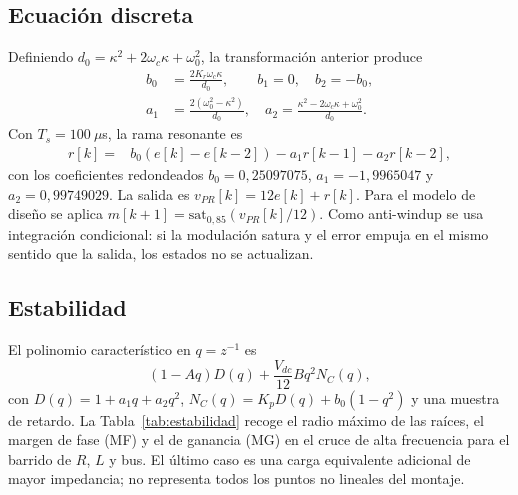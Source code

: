 \documentclass[conference]{IEEEtran}
\begin{document}
\subsection{Ecuación discreta}
Definiendo $d_0=\kappa^2+2\omega_c\kappa+\omega_0^2$, la transformación anterior produce
\begin{align}
b_0&=\frac{2K_r\omega_c\kappa}{d_0},\qquad b_1=0,\quad b_2=-b_0,\\
a_1&=\frac{2(\omega_0^2-\kappa^2)}{d_0},\quad
a_2=\frac{\kappa^2-2\omega_c\kappa+\omega_0^2}{d_0}.
\end{align}
Con $T_s=100\ \mu$s, la rama resonante es
\begin{align}
r[k]={}&b_0(e[k]-e[k-2])-a_1r[k-1]-a_2r[k-2],
\end{align}
con los coeficientes redondeados $b_0=0{,}25097075$, $a_1=-1{,}9965047$ y $a_2=0{,}99749029$. La salida es $v_{PR}[k]=12e[k]+r[k]$. Para el modelo de diseño se aplica $m[k+1]=\mathrm{sat}_{0{,}85}(v_{PR}[k]/12)$. Como anti-windup se usa integración condicional: si la modulación satura y el error empuja en el mismo sentido que la salida, los estados no se actualizan.

\subsection{Estabilidad}
El polinomio característico en $q=z^{-1}$ es
\begin{equation}
(1-Aq)D(q)+\frac{V_{dc}}{12}Bq^2N_C(q),
\end{equation}
con $D(q)=1+a_1q+a_2q^2$, $N_C(q)=K_pD(q)+b_0(1-q^2)$ y una muestra de retardo. La Tabla~\ref{tab:estabilidad} recoge el radio máximo de las raíces, el margen de fase (MF) y el de ganancia (MG) en el cruce de alta frecuencia para el barrido de $R$, $L$ y bus. El último caso es una carga equivalente adicional de mayor impedancia; no representa todos los puntos no lineales del montaje.
\end{document}
